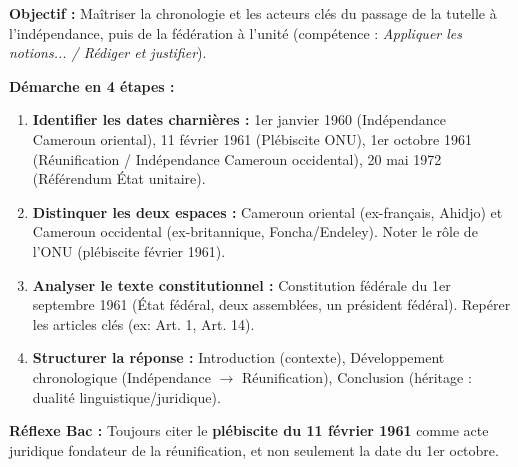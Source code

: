\documentclass[11pt]{article}
\begin{document}
\begin{methode}
\textbf{Objectif :} Maîtriser la chronologie et les acteurs clés du passage de la tutelle à l'indépendance, puis de la fédération à l'unité (compétence : \emph{Appliquer les notions... / Rédiger et justifier}).
\par
\textbf{Démarche en 4 étapes :}
\begin{enumerate}
    \item \textbf{Identifier les dates charnières :} 1er janvier 1960 (Indépendance Cameroun oriental), 11 février 1961 (Plébiscite ONU), 1er octobre 1961 (Réunification / Indépendance Cameroun occidental), 20 mai 1972 (Référendum État unitaire).
    \item \textbf{Distinquer les deux espaces :} Cameroun oriental (ex-français, Ahidjo) et Cameroun occidental (ex-britannique, Foncha/Endeley). Noter le rôle de l'ONU (plébiscite février 1961).
    \item \textbf{Analyser le texte constitutionnel :} Constitution fédérale du 1er septembre 1961 (État fédéral, deux assemblées, un président fédéral). Repérer les articles clés (ex: Art. 1, Art. 14).
    \item \textbf{Structurer la réponse :} Introduction (contexte), Développement chronologique (Indépendance $\rightarrow$ Réunification), Conclusion (héritage : dualité linguistique/juridique).
\end{enumerate}
\textbf{Réflexe Bac :} Toujours citer le \textbf{plébiscite du 11 février 1961} comme acte juridique fondateur de la réunification, et non seulement la date du 1er octobre.
\end{methode}
\end{document}
